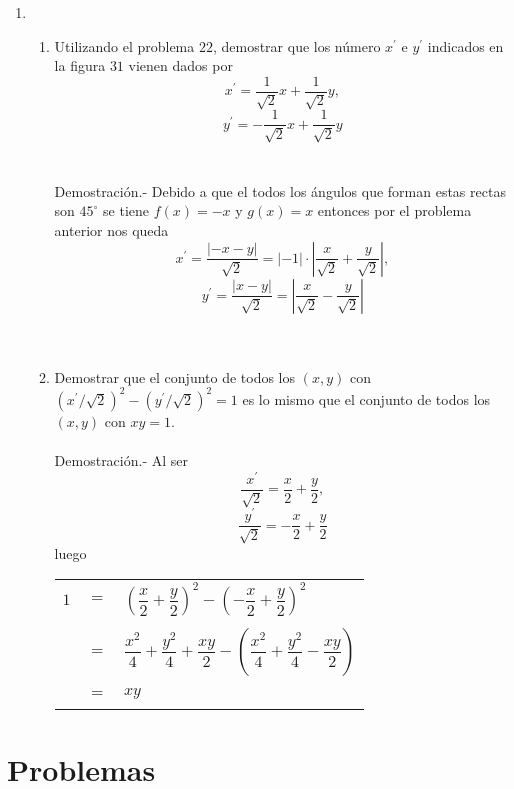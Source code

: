 \begin{enumerate}
    \item 
    \begin{enumerate}[\bfseries (a)]
	
	\item Utilizando el problema $22$, demostrar que los número $x^{'}$ e $y^{'}$ indicados en la figura $31$ vienen dados por $$x^{'} = \dfrac{1}{\sqrt{2}}x + \dfrac{1}{\sqrt{2}}y,$$ $$y^{'}= - \dfrac{1}{\sqrt{2}}x + \dfrac{1}{\sqrt{2}}y$$\\\\
	    Demostración.-\; Debido a que el todos los ángulos que forman estas rectas son $45^{\circ}$ se tiene $f(x)=-x$ y $g(x)=x$ entonces por el problema anterior nos queda $$x^{'}=\dfrac{|-x-y|}{\sqrt{2}} = |-1|\cdot \left| \dfrac{x}{\sqrt{2}} + \dfrac{y}{\sqrt{2}}\right|,$$ $$y^{'} = \dfrac{|x-y|}{\sqrt{2}}= \left|\dfrac{x}{\sqrt{2}} - \dfrac{y}{\sqrt{2}}\right|$$\\\\

	\item Demostrar que el conjunto de todos los $(x,y)$ con $(x^{'} / \sqrt{2})^2 - (y^{'}/\sqrt{2})^2 = 1$ es lo mismo que el conjunto de todos los $(x,y)$ con $xy=1$.\\\\
	    Demostración.-\; Al ser $$\dfrac{x^{'}}{\sqrt{2}} = \dfrac{x}{2} + \dfrac{y}{2},$$ $$\dfrac{y^{'}}{\sqrt{2}}=-\dfrac{x}{2}+\dfrac{y}{2}$$ luego 
	    \begin{center}
		\begin{tabular}{ccl}
		    $1$&$=$&$\left( \dfrac{x}{2} + \dfrac{y}{2} \right)^2 - \left( - \dfrac{x}{2} + \dfrac{y}{2} \right)^2$\\\\
		    &$=$&$\dfrac{x^2}{4} + \dfrac{y^2}{4} + \dfrac{xy}{2} - \left( \dfrac{x^2}{4} + \dfrac{y^2}{4} - \dfrac{xy}{2} \right)$\\\\
		    &$=$&$xy$\\\\
		\end{tabular}
	    \end{center}
	    
    \end{enumerate}

\end{enumerate}

\section{Problemas}


